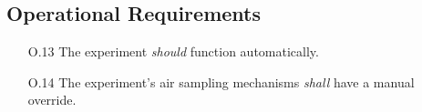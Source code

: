\pagebreak
\subsection{Operational Requirements}

\begin{enumerate}
    \item[O.13] The experiment \textit{should} function automatically.
    \item[O.14] The experiment's air sampling mechanisms \textit{shall} have a manual override.
\end{enumerate} 